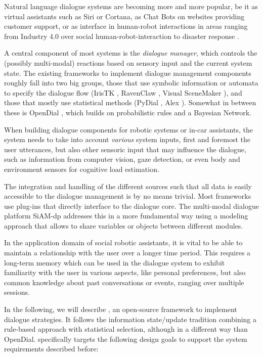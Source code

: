 Natural language dialogue systems are becoming more and more popular, be it as
virtual assistants such as Siri or Cortana, as Chat Bots on websites providing
customer support, or as interface in human-robot interactions in areas ranging
from Industry 4.0 \citep{schwartz2016hybrid} over social human-robot-interaction
\citep{alize2010} to disaster response \citep{kruijff2015tradr}.

A central component of most systems is the \emph{dialogue manager}, which
controls the (possibly multi-modal) reactions based on sensory input and the
current system state. The existing frameworks to implement dialogue management
components roughly fall into two big groups, those that use symbolic
information or automata to specify the dialogue flow (IrisTK
\citep{2012iristk}, RavenClaw \citep{bohus2009ravenclaw}, Visual SceneMaker
\citep{gebhard2012visual}), and those that mostly use statistical methods
(PyDial \cite{ultes2017pydial}, Alex \citep{jurvcivcek2014alex}). Somewhat in
between these is OpenDial \citep{lison2015developing}, which builds on
probabilistic rules and a Bayesian Network.

When building dialogue components for robotic systems or in-car assistants, the system
needs to take into account \emph{various} system inputs, first and foremost the
user utterances, but also other sensoric input that may influence the dialogue,
such as information from computer vision, gaze detection, or even body and
environment sensors for cognitive load estimation.

The integration and handling of the different sources such that all data is
easily accessible to the dialogue management is by no means trivial. Most
frameworks use plug-ins that directly interface to the dialogue core. The
multi-modal dialogue platform SiAM-dp \citep{nesselrath2014siam}
addresses this in a more fundamental way using a modeling approach that allows
to share variables or objects between different modules.

In the application domain of social robotic assistants, it is vital to be able
to maintain a relationship with the user over a longer time period. This requires a long-term
memory which can be used in the dialogue system to exhibit familiarity with the
user in various aspects, like personal preferences, but also common knowledge
about past conversations or events, ranging over multiple sessions.

In the following, we will describe \vonda, an open-source framework to
implement dialogue strategies. It follows the information state/update
tradition \citep{traum2003information}
combining a rule-based approach with statistical selection, although in a
different way than OpenDial. \vonda specifically targets the following design
goals to support the system requirements described before:

